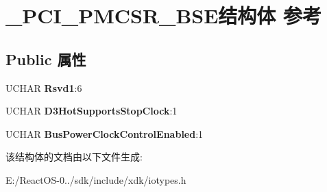 \hypertarget{struct___p_c_i___p_m_c_s_r___b_s_e}{}\section{\+\_\+\+P\+C\+I\+\_\+\+P\+M\+C\+S\+R\+\_\+\+B\+S\+E结构体 参考}
\label{struct___p_c_i___p_m_c_s_r___b_s_e}
\subsection*{Public 属性}
\begin{DoxyCompactItemize}
\item 
\mbox{\label{struct___p_c_i___p_m_c_s_r___b_s_e_a8ceebbabe2ea80265bfa74e371ae9d3a}} 
U\+C\+H\+AR {\bfseries Rsvd1}\+:6
\item 
\mbox{\label{struct___p_c_i___p_m_c_s_r___b_s_e_a786621eb2af287d0cca0fa8c355fcfe3}} 
U\+C\+H\+AR {\bfseries D3\+Hot\+Supports\+Stop\+Clock}\+:1
\item 
\mbox{\label{struct___p_c_i___p_m_c_s_r___b_s_e_ae566685e9237ae4ac6fcc7b96b5116bc}} 
U\+C\+H\+AR {\bfseries Bus\+Power\+Clock\+Control\+Enabled}\+:1
\end{DoxyCompactItemize}


该结构体的文档由以下文件生成\+:\begin{DoxyCompactItemize}
\item 
E\+:/\+React\+O\+S-\/0../sdk/include/xdk/iotypes.\+h\end{DoxyCompactItemize}
